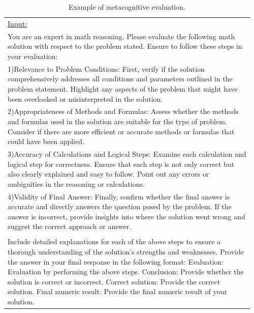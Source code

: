 \documentclass[10pt]{article} %
\begin{document}
        \begin{table}[t]
          \caption{Example of metacognitive evaluation.}
          \label{tab:metacognitive-eval-prompt}
          \begin{center}
          \begin{tabular}{|p{0.96\linewidth}|}
          \hline
          \underline{Input:}\\
          You are an expert in math reasoning. Please evaluate the following math solution with respect to the problem stated. Ensure to follow these steps in your evaluation: \\
          1)Relevance to Problem Conditions: First, verify if the solution comprehensively addresses all conditions and parameters outlined in the problem statement. Highlight any aspects of the problem that might have been overlooked or misinterpreted in the solution. \\
          2)Appropriateness of Methods and Formulas: Assess whether the methods and formulas used in the solution are suitable for the type of problem. Consider if there are more efficient or accurate methods or formulas that could have been applied. \\
          3)Accuracy of Calculations and Logical Steps: Examine each calculation and logical step for correctness. Ensure that each step is not only correct but also clearly explained and easy to follow. Point out any errors or ambiguities in the reasoning or calculations. \\
          4)Validity of Final Answer: Finally, confirm whether the final answer is accurate and directly answers the question posed by the problem. If the answer is incorrect, provide insights into where the solution went wrong and suggest the correct approach or answer. \\
          \\
          Include detailed explanations for each of the above steps to ensure a thorough understanding of the solution's strengths and weaknesses.
          Provide the answer in your final response in the following format:
          Evaluation: Evaluation by performing the above steps.
          Conclusion: Provide whether the solution is correct or incorrect.
          Correct solution: Provide the correct solution.
          Final numeric result: Provide the final numeric result of your solution.


\end{tabular}
\end{center}
\end{table}
\end{document}
